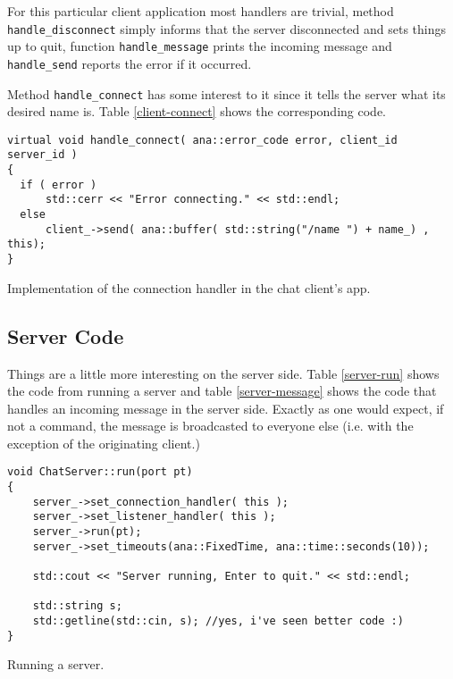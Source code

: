 \documentclass[a4paper,12pt,english]{article}
\begin{document}
For this particular client application most handlers are trivial, method
\texttt{handle\_disconnect} simply informs that the server disconnected
and sets things up to quit, function \texttt{handle\_message} prints the
incoming message and \texttt{handle\_send} reports the error if it occurred.

Method \texttt{handle\_connect} has some interest to it since it tells the
server what its desired name is. Table \ref{client-connect} shows the
corresponding code.

\begin{table}[!htb]
\lstset{language=C++}
\begin{lstlisting}[frame=single]
virtual void handle_connect( ana::error_code error, client_id server_id )
{
  if ( error )
      std::cerr << "Error connecting." << std::endl;
  else
      client_->send( ana::buffer( std::string("/name ") + name_) , this);
}
\end{lstlisting}
\centering \caption{Implementation of the connection handler in the chat client's app.} 
\label{client-connect}
\end{table}

\subsection{Server Code}

Things are a little more interesting on the server side. Table \ref{server-run}
shows the code from running a server and table \ref{server-message} shows the
code that handles an incoming message in the server side. Exactly as one would
expect, if not a command, the message is broadcasted to everyone else (i.e.
with the exception of the originating client.)


\begin{table}[!htb]
\lstset{language=C++}
\begin{lstlisting}[frame=single]
void ChatServer::run(port pt)
{
    server_->set_connection_handler( this );
    server_->set_listener_handler( this );
    server_->run(pt);
    server_->set_timeouts(ana::FixedTime, ana::time::seconds(10));

    std::cout << "Server running, Enter to quit." << std::endl;

    std::string s;
    std::getline(std::cin, s); //yes, i've seen better code :)
}
\end{lstlisting}
\centering \caption{Running a server.} 
\label{server-run}
\end{table} 
\end{document}
